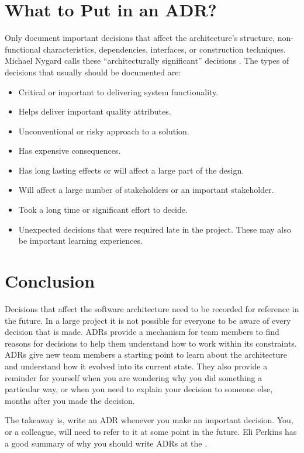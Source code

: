 \section{What to Put in an ADR?}
Only document important decisions that affect the architecture's structure,
non-functional characteristics, dependencies, interfaces, or construction techniques.
Michael Nygard calls these ``architecturally significant'' decisions \cite{nygard-adr}.
The types of decisions that usually should be documented are:
\begin{itemize}[noitemsep,nolistsep]
    \item Critical or important to delivering system functionality.
    \item Helps deliver important quality attributes.
    \item Unconventional or risky approach to a solution.
    \item Has expensive consequences.
    \item Has long lasting effects or will affect a large part of the design.
    \item Will affect a large number of stakeholders or an important stakeholder.
    \item Took a long time or significant effort to decide.
    \item Unexpected decisions that were required late in the project. These may also be important learning experiences.
\end{itemize}

\section{Conclusion}
Decisions that affect the software architecture need to be recorded for reference in the future.
In a large project it is not possible for everyone to be aware of every decision that is made.
ADRs provide a mechanism for team members to find reasons for decisions to help them understand how to work within its constraints.
ADRs give new team members a starting point to learn about the architecture and understand how it evolved into its current state.
They also provide a reminder for yourself when you are wondering why you did something a particular way,
or when you need to explain your decision to someone else, months after you made the decision.

The takeaway is, write an ADR whenever you make an important decision.
You, or a colleague, will need to refer to it at some point in the future.
Eli Perkins has a good summary of why you should write ADRs at the
 \cite{why-write-adrs}.
